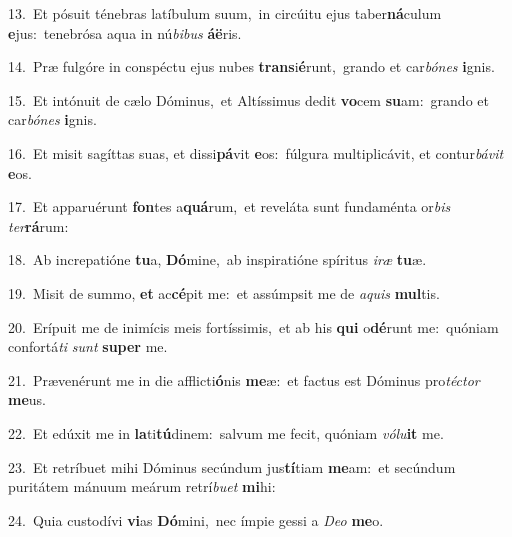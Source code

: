 {\numbfont\textcolor{\numbcolor}{13.}}~Et pósuit ténebras latíbulum suum,~\dagger in circúitu ejus taber\-\textbf{ná}\-culum \textbf{e}\-jus:~\star tenebrósa aqua in nú\-\textit{bi}\-\textit{bus} \textbf{á}\-\textbf{ë}ris.\par
{\numbfont\textcolor{\numbcolor}{14.}}~Præ fulgóre in conspéctu ejus nubes \textbf{trans}\-i\-\textbf{é}\-runt,~\star grando et car\-\textit{bó}\-\textit{nes} \textbf{i}\-gnis.\par
{\numbfont\textcolor{\numbcolor}{15.}}~Et intónuit de cælo Dóminus,~\dagger et Altíssimus dedit \textbf{vo}\-cem \textbf{su}\-am:~\star grando et car\-\textit{bó}\-\textit{nes} \textbf{i}\-gnis.\par
{\numbfont\textcolor{\numbcolor}{16.}}~Et misit sagíttas suas, et dissi\-\textbf{pá}\-vit \textbf{e}\-os:~\star fúlgura multiplicávit, et contur\-\textit{bá}\-\textit{vit} \textbf{e}\-os.\par
{\numbfont\textcolor{\numbcolor}{17.}}~Et apparuérunt \textbf{fon}\-tes a\-\textbf{quá}\-rum,~\star et reveláta sunt fundaménta or\textit{bis} \textit{ter}\-\textbf{rá}rum:\par
{\numbfont\textcolor{\numbcolor}{18.}}~Ab increpatióne \textbf{tu}\-a, \textbf{Dó}\-mine,~\star ab inspiratióne spíritus \textit{i}\-\textit{ræ} \textbf{tu}\-æ.\par
{\numbfont\textcolor{\numbcolor}{19.}}~Misit de summo, \textbf{et} ac\-\textbf{cé}\-pit me:~\star et assúmpsit me de \textit{a}\-\textit{quis} \textbf{mul}\-tis.\par
{\numbfont\textcolor{\numbcolor}{20.}}~Erípuit me de inimícis meis fortíssimis,~\dagger et ab his \textbf{qui} o\-\textbf{dé}\-runt me:~\star quóniam confortá\textit{ti} \textit{sunt} \textbf{su}\-\textbf{per} me.\par
{\numbfont\textcolor{\numbcolor}{21.}}~Prævenérunt me in die afflicti\-\textbf{ó}\-nis \textbf{me}\-æ:~\star et factus est Dóminus pro\-\textit{téc}\-\textit{tor} \textbf{me}\-us.\par
{\numbfont\textcolor{\numbcolor}{22.}}~Et edúxit me in \textbf{la}\-ti\-\textbf{tú}\-dinem:~\star salvum me fecit, quóniam \textit{vó}\-\textit{lu}\textbf{it} me.\par
{\numbfont\textcolor{\numbcolor}{23.}}~Et retríbuet mihi Dóminus secúndum jus\-\textbf{tí}\-tiam \textbf{me}\-am:~\star et secúndum puritátem mánuum meárum retrí\-\textit{bu}\-\textit{et} \textbf{mi}\-hi:\par
{\numbfont\textcolor{\numbcolor}{24.}}~Quia custodívi \textbf{vi}\-as \textbf{Dó}\-mini,~\star nec ímpie gessi a \textit{De}\-\textit{o} \textbf{me}\-o.\par

